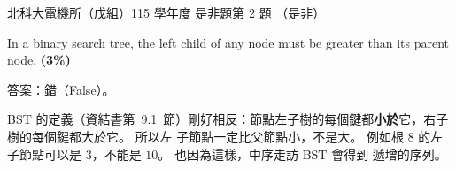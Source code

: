 \begin{pastexam}[label={px:ntut-115-ee-ds-02}]{北科大電機所（戊組）115 學年度 是非題第 2 題}
（是非）

In a binary search tree, the left child of any node must be greater than its parent node.
\textbf{(3\%)}
\end{pastexam}

\begin{pastsoln}
答案：錯（False）。

BST 的定義（資結書第~9.1~節）剛好相反：節點左子樹的每個鍵都\textbf{小於}它，右子樹的每個鍵都大於它。 所以左
子節點一定比父節點小，不是大。 例如根 $8$ 的左子節點可以是 $3$，不能是 $10$。 也因為這樣，中序走訪 BST 會得到
遞增的序列。
\end{pastsoln}
